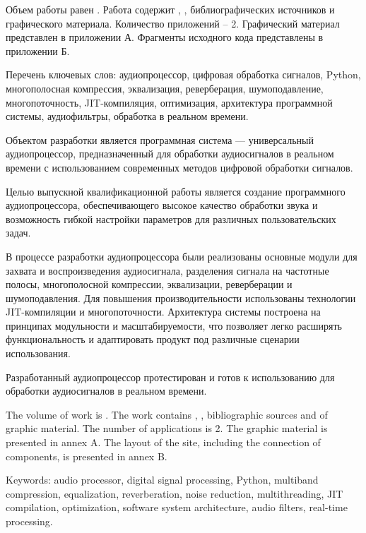 
Объем работы равен . Работа содержит , ,  библиографических источников и  графического материала. Количество приложений – 2. Графический материал представлен в приложении А. Фрагменты исходного кода представлены в приложении Б.

Перечень ключевых слов: аудиопроцессор, цифровая обработка сигналов, Python, многополосная компрессия, эквализация, реверберация, шумоподавление, многопоточность, JIT-компиляция, оптимизация, архитектура программной системы, аудиофильтры, обработка в реальном времени.

Объектом разработки является программная система — универсальный аудиопроцессор, предназначенный для обработки аудиосигналов в реальном времени с использованием современных методов цифровой обработки сигналов.

Целью выпускной квалификационной работы является создание программного аудиопроцессора, обеспечивающего высокое качество обработки звука и возможность гибкой настройки параметров для различных пользовательских задач.

В процессе разработки аудиопроцессора были реализованы основные модули для захвата и воспроизведения аудиосигнала, разделения сигнала на частотные полосы, многополосной компрессии, эквализации, реверберации и шумоподавления. Для повышения производительности использованы технологии JIT-компиляции и многопоточности. Архитектура системы построена на принципах модульности и масштабируемости, что позволяет легко расширять функциональность и адаптировать продукт под различные сценарии использования.

Разработанный аудиопроцессор протестирован и готов к использованию для обработки аудиосигналов в реальном времени.


The volume of work is . The work contains , ,  bibliographic sources and  of graphic material. The number of applications is 2. The graphic material is presented in annex A. The layout of the site, including the connection of components, is presented in annex B.

Keywords: audio processor, digital signal processing, Python, multiband compression, equalization, reverberation, noise reduction, multithreading, JIT compilation, optimization, software system architecture, audio filters, real-time processing.

